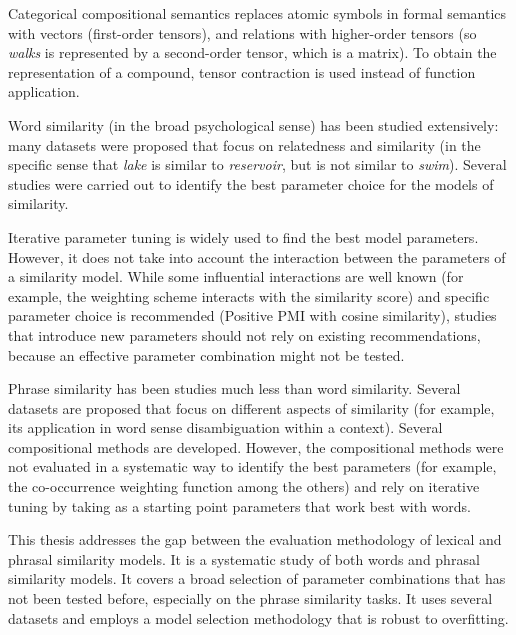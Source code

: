 Categorical compositional semantics replaces atomic symbols in formal semantics with vectors (first-order tensors), and relations with higher-order tensors (so \textit{walks} is represented by a second-order tensor, which is a matrix). To obtain the representation of a compound, tensor contraction is used instead of function application.

Word similarity (in the broad psychological sense) has been studied extensively: many datasets were proposed that focus on relatedness and similarity (in the specific sense that \textit{lake} is similar to \textit{reservoir}, but is not similar to \textit{swim}). Several studies were carried out to identify the best parameter choice for the models of similarity.

Iterative parameter tuning is widely used to find the best model parameters. However, it does not take into account the interaction between the parameters of a similarity model. While some influential interactions are well known (for example, the weighting scheme interacts with the similarity score) and specific parameter choice is recommended (Positive PMI with cosine similarity), studies that introduce new parameters should not rely on existing recommendations, because an effective parameter combination might not be tested.

Phrase similarity has been studies much less than word similarity. Several datasets  are proposed that focus on different aspects of similarity (for example, its application in word sense disambiguation within a context). Several compositional methods are developed. However, the compositional methods were not evaluated in a systematic way to identify the best parameters (for example, the co-occurrence weighting function among the others) and rely on iterative tuning by taking as a starting point parameters that work best with words.

This thesis addresses the gap between the evaluation methodology of lexical and phrasal similarity models. It is a systematic study of both words and phrasal similarity models. It covers a broad selection of parameter combinations that has not been tested before, especially on the phrase similarity tasks. It uses several datasets and employs a model selection methodology that is robust to overfitting.


